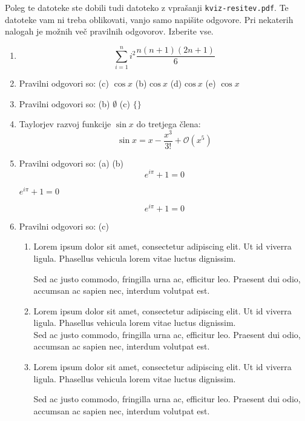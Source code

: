 \documentclass[11pt]{article}
\begin{document}
Poleg te datoteke ste dobili tudi datoteko z vprašanji \texttt{kviz-resitev.pdf}.
Te datoteke vam ni treba oblikovati, vanjo samo napišite odgovore.
Pri nekaterih nalogah je možnih več pravilnih odgovorov. Izberite vse.

\begin{enumerate}
    \item \[ \sum_{i=1}^{n}i^2 \frac{n(n+1)(2n+1)}{6}\]%

    \item Pravilni odgovori so: (c) $\cos x$ (b) $\mathrm{cos}~x$ (d) $\text{cos}~x$ (e) $\operatorname{cos} x$%
    
    \item Pravilni odgovori so: (b) $\emptyset$ (c) ${} \{\}$%
    
    \item Taylorjev razvoj funkcije $\sin x$ do tretjega člena: $$\sin x = x - \frac{x^3}{3!}+\mathcal{O}(x^5)$$

    \item Pravilni odgovori so:  (a) (b)%
      \[ e^{i \pi} + 1 = 0 \]
      \begin{center}
          \( e^{i \pi} + 1 = 0 \)
      \end{center}
      \begin{equation*}
          e^{i \pi} + 1 = 0
      \end{equation*}

    \item Pravilni odgovori so: (c)%
        \begin{enumerate}
            \item {
                Lorem ipsum dolor sit amet, consectetur adipiscing elit. Ut id viverra ligula. Phasellus vehicula lorem vitae luctus dignissim. 
                
                Sed ac justo commodo, fringilla urna ac, efficitur leo. Praesent dui odio, accumsan ac sapien nec, interdum volutpat est. 
            }
            \item {
                Lorem ipsum dolor sit amet, consectetur adipiscing elit. Ut id viverra ligula. Phasellus vehicula lorem vitae luctus dignissim. \\
                Sed ac justo commodo, fringilla urna ac, efficitur leo. Praesent dui odio, accumsan ac sapien nec, interdum volutpat est. 
            }
            \item {
                Lorem ipsum dolor sit amet, consectetur adipiscing elit. Ut id viverra ligula. Phasellus vehicula lorem vitae luctus dignissim. \par
                Sed ac justo commodo, fringilla urna ac, efficitur leo. Praesent dui odio, accumsan ac sapien nec, interdum volutpat est. 
            }
        \end{enumerate}
    

\end{enumerate}
\end{document}
